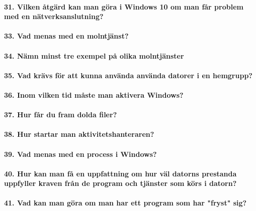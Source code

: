 \paragraph{31. Vilken åtgärd kan man göra i Windows 10 om man får problem med en nätverksanslutning?}

\paragraph{33. Vad menas med en molntjänst?}

\paragraph{34. Nämn minst tre exempel på olika molntjänster}

\paragraph{35. Vad krävs för att kunna använda använda datorer i en hemgrupp?}

\paragraph{36. Inom vilken tid måste man aktivera Windows?}

\paragraph{37. Hur får du fram dolda filer?}

\paragraph{38. Hur startar man aktivitetshanteraren?}

\paragraph{39. Vad menas med en process i Windows?}

\paragraph{40. Hur kan man få en uppfattning om hur väl datorns prestanda uppfyller kraven från de program och tjänster som körs i datorn?}

\paragraph{41. Vad kan man göra om man har ett program som har "fryst" sig?}

